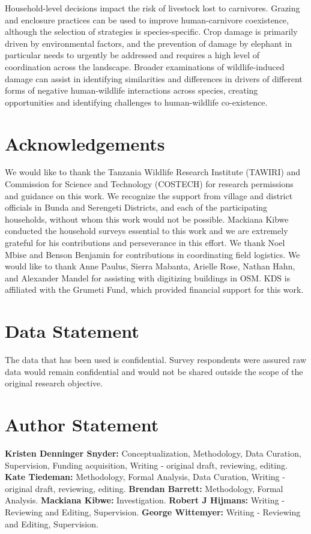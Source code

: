 \documentclass[12pt,]{article}
\begin{document}
Household-level decisions impact the risk of livestock lost to carnivores. Grazing and enclosure practices can be used to improve human-carnivore coexistence, although the selection of strategies is species-specific. Crop damage is primarily driven by environmental factors, and the prevention of damage by elephant in particular needs to urgently be addressed and requires a high level of coordination across the landscape. Broader examinations of wildlife-induced damage can assist in identifying similarities and differences in drivers of different forms of negative human-wildlife interactions across species, creating opportunities and identifying challenges to human-wildlife co-existence. 

\section{Acknowledgements}
We would like to thank the Tanzania Wildlife Research Institute (TAWIRI) and Commission for Science and Technology (COSTECH) for research permissions and guidance on this work. We recognize the support from village and district officials in Bunda and Serengeti Districts, and each of the participating households, without whom this work would not be possible. Mackiana Kibwe conducted the household surveys essential to this work and we are extremely grateful for his contributions and perseverance in this effort. We thank Noel Mbise and Benson Benjamin for contributions in coordinating field logistics. We would like to thank Anne Paulus, Sierra Mabanta, Arielle Rose, Nathan Hahn, and Alexander Mandel for assisting with digitizing buildings in OSM. KDS is affiliated with the Grumeti Fund, which provided financial support for this work.

\section{Data Statement}
The data that has been used is confidential. Survey respondents were assured raw data would remain confidential and would not be shared outside the scope of the original research objective. 

\section{Author Statement}
\textbf{Kristen Denninger Snyder:} Conceptualization, Methodology, Data Curation, Supervision, Funding acquisition, Writing - original draft, reviewing, editing. \textbf{Kate Tiedeman:} Methodology, Formal Analysis, Data Curation, Writing - original draft, reviewing, editing. \textbf{Brendan Barrett:} Methodology, Formal Analysis. \textbf{Mackiana Kibwe:} Investigation. \textbf{Robert J Hijmans:} Writing - Reviewing and Editing, Supervision. \textbf{George Wittemyer:} Writing - Reviewing and Editing, Supervision.
\end{document}

